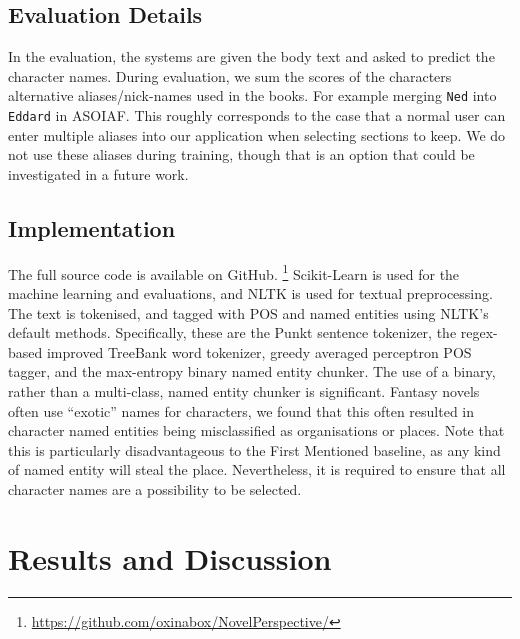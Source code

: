 \documentclass[11pt,a4paper]{article}
\newcommand{\parencite}{\citep}
\begin{document}
\subsection{Evaluation Details}
In the evaluation, the systems are given the body text and asked to predict the character names.
During evaluation, we sum the scores of the characters alternative aliases/nick-names used in the  books.
For example merging \texttt{Ned} into \texttt{Eddard} in ASOIAF.
This roughly corresponds to the case that a normal user can enter multiple aliases into our application when selecting sections to keep.
We do not use these aliases during training, though that is an option that could be investigated in a future work.

\subsection{Implementation}
The full source code is available on GitHub.
\footnote{\url{https://github.com/oxinabox/NovelPerspective/}}
Scikit-Learn \parencite{scikit-learn} is used for the machine learning and evaluations,
and NLTK \parencite{NLTK} is used for textual preprocessing.
The text is tokenised, and tagged with POS and named entities using NLTK's default methods.
Specifically, these are the Punkt sentence tokenizer, the regex-based improved TreeBank word tokenizer, greedy averaged perceptron POS tagger, and the max-entropy binary named entity chunker.
The use of a binary, rather than a multi-class, named entity chunker is significant.
Fantasy novels often use ``exotic'' names for characters, we found that this often resulted in character named entities being misclassified as organisations or places.
Note that this is particularly disadvantageous to the First Mentioned baseline, as any kind of named entity will steal the place.
Nevertheless, it is required to ensure that all character names are a possibility to be selected.


\section{Results and Discussion}\label{sec:results-and-discussion}

\begin{table}
	\begin{adjustbox}{max width=\columnwidth}
		
	\end{adjustbox}
	
	\caption{The results of the character classifier systems. The best results are \textbf{bolded}.
	} \label{tbl:resmain}
\end{table}
\end{document}
